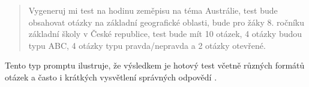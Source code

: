 \begin{enumerate}
\begin{enumerate}
\begin{quote}
\begin{PromptBlock}

Vygeneruj mi test na hodinu zeměpisu na téma Austrálie, test bude obsahovat otázky na základní geografické oblasti, bude pro žáky 8. ročníku základní školy v České republice, test bude mít 10 otázek, 4 otázky budou typu ABC, 4 otázky typu pravda/nepravda a 2 otázky otevřené.
\end{PromptBlock}

        \end{quote}
        Tento typ promptu ilustruje, že výsledkem je hotový test včetně různých formátů otázek a často i krátkých vysvětlení správných odpovědí \cite{kb_ai_101_tipu_pdf_04e4a115_page_36_1}.
    \end{enumerate}
\end{enumerate}

